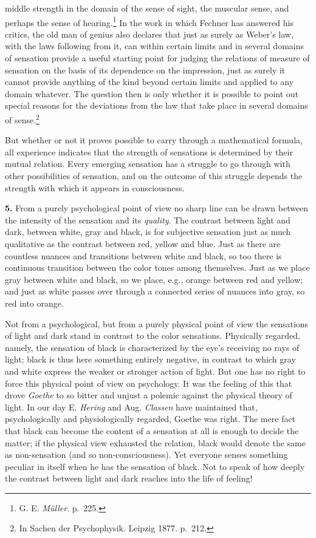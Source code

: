 \documentclass[12pt,a4paper]{book}
\newcommand{\opage}[1]{\marginnote{\footnotesize\textit{[#1]}}}
\begin{document}
middle strength in the domain of the sense of sight, the muscular sense,
and perhaps
the sense of hearing.\footnote{G. E. \emph{Müller}. p.~225.} In the work
in which Fechner has answered his critics, the old man of genius also
declares that just as surely as Weber's law, with the laws following
from it, can within certain limits and in several domains of sensation
provide a useful starting point for judging the relations of measure of
sensation on the basis of its dependence on the impression, just as
surely it cannot provide anything of the kind beyond certain limits and
applied to any domain whatever. The question then is only whether it is
possible to point out special reasons for the deviations from the law
that take place in several domains of sense.\footnote{In Sachen der
Psychophysik. Leipzig 1877. p.~212.}

But whether or not it proves possible to carry through a mathematical
formula, all experience indicates that the strength of sensations is
determined by their mutual relation. Every emerging sensation has a
struggle to go through with other possibilities of sensation, and on the
outcome of this struggle depends the strength with which it appears in
consciousness.

\textbf{5.} From a purely psychological point of view no sharp line can
be drawn between the intensity of the sensation and its
\emph{quality}. The contrast between light and dark, between white, gray
and black, is for subjective sensation just as much qualitative as the
contrast between red, yellow and blue. Just as there are countless
nuances and transitions between white and black, so too there is
continuous transition between the color tones among themselves. Just as
we place gray between white and black, so we place, e.g., orange between
red and yellow; and just as white passes over through a connected series
of nuances into gray, so red into orange.

\opage{135}Not from a psychological, but from a purely physical point of
view the sensations of light and dark stand in contrast to the color
sensations. Physically regarded, namely, the sensation of black is
characterized by the eye's receiving no rays of light; black is thus
here something entirely negative, in contrast to which gray and white
express the weaker or stronger action of light. But one has no right to
force this physical point of view on psychology. It was the feeling of
this that drove \emph{Goethe} to so bitter and unjust a polemic against
the physical theory of light. In our day E. \emph{Hering} and Aug.
\emph{Classen} have maintained that, psychologically and physiologically
regarded, Goethe was right. The mere fact that black can become the
content of a sensation at all is enough to decide the matter; if the
physical view exhausted the relation, black would denote the same as
non-sensation (and so non-consciousness). Yet everyone senses something
peculiar in itself when he has the sensation of black. Not to speak of
how deeply the contrast between light and dark reaches into the life of
feeling!
\end{document}
